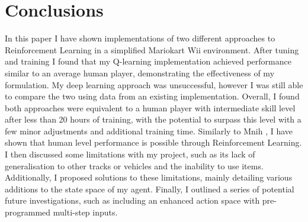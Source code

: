 \chapter{Conclusions}
In this paper I have shown implementations of two different approaches to Reinforcement Learning in a simplified Mariokart Wii environment. After tuning and training I found that my Q-learning implementation achieved performance similar to an average human player, demonstrating the effectiveness of my formulation. My deep learning approach was unsuccessful, however I was still able to compare the two using data from an existing implementation. Overall, I found both approaches were equivalent to a human player with intermediate skill level after less than 20 hours of training, with the potential to surpass this level with a few minor adjustments and additional training time. Similarly to Mnih \cite{mnih2015human}, I have shown that human level performance is possible through Reinforcement Learning. I then discussed some limitations with my project, such as its lack of generalisation to other tracks or vehicles and the inability to use items. Additionally, I proposed solutions to these limitations, mainly detailing various additions to the state space of my agent. Finally, I outlined a series of potential future investigations, such as including an enhanced action space with pre-programmed multi-step inputs.